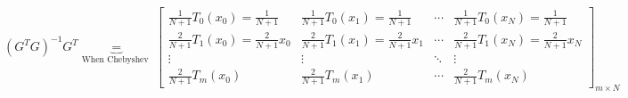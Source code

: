 $$
\left(G^{T} G\right)^{-1} G^{T} \underbrace{=}_{\text {When Chebyshev }}\left[\begin{array}{cccc}
\frac{1}{N+1} T_{0}\left(x_{0}\right)=\frac{1}{N+1} & \frac{1}{N+1} T_{0}\left(x_{1}\right)=\frac{1}{N+1} & \cdots & \frac{1}{N+1} T_{0}\left(x_{N}\right)=\frac{1}{N+1} \\
\frac{2}{N+1} T_{1}\left(x_{0}\right)=\frac{2}{N+1} x_{0} & \frac{2}{N+1} T_{1}\left(x_{1}\right)=\frac{2}{N+1} x_{1} & \cdots & \frac{2}{N+1} T_{1}\left(x_{N}\right)=\frac{2}{N+1} x_{N} \\
\vdots & \vdots & \ddots & \vdots \\
\frac{2}{N+1} T_{m}\left(x_{0}\right) & \frac{2}{N+1} T_{m}\left(x_{1}\right) & \cdots & \frac{2}{N+1} T_{m}\left(x_{N}\right)
\end{array}\right]_{m \times N}
$$

